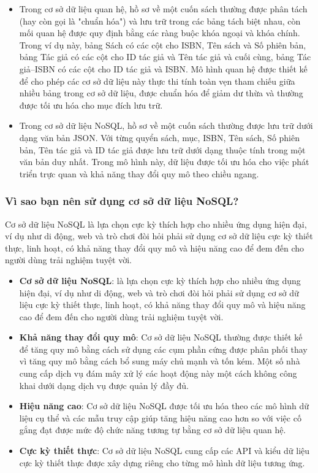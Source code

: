 {{\begin{itemize}
	\item Trong cơ sở dữ liệu quan hệ, hồ sơ về một cuốn sách thường được phân tách (hay còn gọi là "chuẩn hóa") và lưu trữ trong các bảng tách biệt nhau, còn mối quan hệ được quy định bằng các ràng buộc khóa ngoại và khóa chính. Trong ví dụ này, bảng Sách có các cột cho ISBN, Tên sách và Số phiên bản, bảng Tác giả có các cột cho ID tác giả và Tên tác giả và cuối cùng, bảng Tác giả–ISBN có các cột cho ID tác giả và ISBN. Mô hình quan hệ được thiết kế để cho phép các cơ sở dữ liệu này thực thi tính toàn vẹn tham chiếu giữa nhiều bảng trong cơ sở dữ liệu, được chuẩn hóa để giảm dư thừa và thường được tối ưu hóa cho mục đích lưu trữ.
	\item Trong cơ sở dữ liệu NoSQL, hồ sơ về một cuốn sách thường được lưu trữ dưới dạng văn bản JSON. Với từng quyển sách, mục, ISBN, Tên sách, Số phiên bản, Tên tác giả và ID tác giả được lưu trữ dưới dạng thuộc tính trong một văn bản duy nhất. Trong mô hình này, dữ liệu được tối ưu hóa cho việc phát triển trực quan và khả năng thay đổi quy mô theo chiều ngang.
\end{itemize}
\subsubsection{Vì sao bạn nên sử dụng cơ sở dữ liệu NoSQL?\cite{web:nosql}}
Cơ sở dữ liệu NoSQL là lựa chọn cực kỳ thích hợp cho nhiều ứng dụng hiện đại, ví dụ như di động, web và trò chơi đòi hỏi phải sử dụng cơ sở dữ liệu cực kỳ thiết thực, linh hoạt, có khả năng thay đổi quy mô và hiệu năng cao để đem đến cho người dùng trải nghiệm tuyệt vời.
\begin{itemize}
	\item \textbf{Cơ sở dữ liệu NoSQL}: là lựa chọn cực kỳ thích hợp cho nhiều ứng dụng hiện đại, ví dụ như di động, web và trò chơi đòi hỏi phải sử dụng cơ sở dữ liệu cực kỳ thiết thực, linh hoạt, có khả năng thay đổi quy mô và hiệu năng cao để đem đến cho người dùng trải nghiệm tuyệt vời.
	\item \textbf{Khả năng thay đổi quy mô}: Cơ sở dữ liệu NoSQL thường được thiết kế để tăng quy mô bằng cách sử dụng các cụm phần cứng được phân phối thay vì tăng quy mô bằng cách bổ sung máy chủ mạnh và tốn kém. Một số nhà cung cấp dịch vụ đám mây xử lý các hoạt động này một cách không công khai dưới dạng dịch vụ được quản lý đầy đủ.
	\item \textbf{Hiệu năng cao}: Cơ sở dữ liệu NoSQL được tối ưu hóa theo các mô hình dữ liệu cụ thể và các mẫu truy cập giúp tăng hiệu năng cao hơn so với việc cố gắng đạt được mức độ chức năng tương tự bằng cơ sở dữ liệu quan hệ.
	\item \textbf{Cực kỳ thiết thực}: Cơ sở dữ liệu NoSQL cung cấp các API và kiểu dữ liệu cực kỳ thiết thực được xây dựng riêng cho từng mô hình dữ liệu tương ứng.
\end{itemize}
}}
